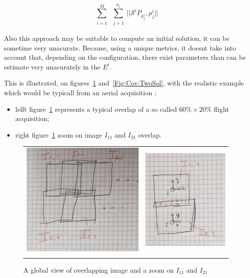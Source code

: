 \begin{equation}
    \sum\limits_{\substack{i=1 }}^{M} \sum \limits_{\substack{j=1 }}^{n_i}  || \mathcal{S}^i  P_{k^i_j} , p^i_j  ||  \label{Eq:Cov:MinDist}
\end{equation}

Also this approach may be suitable to compute an initial solution, it can
be sometime very unacurate.  Because, using a unique metrics, it doesnt take
into account that, depending on the configuration, there exist parameters
than can be estimate very unacurately in the $E^i$. 

This is illustrated, on figures~\ref{Fig:Cov:Overlap} and~\ref{Fig:Cov:TwoSol}, 
with the realistic example which would be typicall from 
an aerial acquisition  :

\begin{itemize}
    \item  lelft figure~\ref{Fig:Cov:Overlap} represents a typical overlap of
          a so called $60\% \times 20\%$ flight acquisition;
    \item  right figure~\ref{Fig:Cov:Overlap} zoom on image $I_{11}$ and $I_{21}$
          overlap.
\end{itemize}



\begin{figure}
\begin{center}
\begin{tabular}{||c|c||}
   \hline \hline
\includegraphics[width=70mm]{FIGS/Cov/Global.jpeg} &
\includegraphics[width=50mm]{FIGS/Cov/TwoIm.jpeg} \\
  \\ \hline  \hline
\end{tabular}
\label{Fig:Cov:Overlap}
\caption{A global view of overlapping image and a zoom on $I_{11}$ and $I_21$}
\end{center}
\end{figure}


